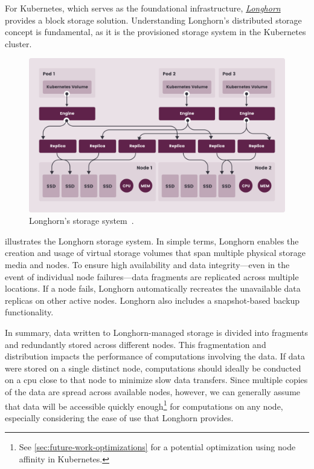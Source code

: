 For Kubernetes, which serves as the foundational infrastructure, \href{https://longhorn.io/}{\textit{Longhorn}} provides a block storage solution.
Understanding Longhorn's distributed storage concept is fundamental, as it is the provisioned storage system in the Kubernetes cluster.

\begin{figure}[H]
    \centering
    \includegraphics[width=\textwidth]{figures/longhorn.png}
    \caption{Longhorn's storage system~\cite{LonghornAuthors2024}.}
    \label{fig:longhorn}
\end{figure}

 illustrates the Longhorn storage system.
In simple terms, Longhorn enables the creation and usage of virtual storage volumes that span multiple physical storage media and nodes.
To ensure high availability and data integrity—even in the event of individual node failures—data fragments are replicated across multiple locations.
If a node fails, Longhorn automatically recreates the unavailable data replicas on other active nodes.
Longhorn also includes a snapshot-based backup functionality.

In summary, data written to Longhorn-managed storage is divided into fragments and redundantly stored across different nodes.
This fragmentation and distribution impacts the performance of computations involving the data.
If data were stored on a single distinct node, computations should ideally be conducted on a \ac{cpu} close to that node to minimize slow data transfers.
Since multiple copies of the data are spread across available nodes, however, we can generally assume that data will be accessible quickly enough\footnote{See \cref{sec:future-work-optimizations} for a potential optimization using node affinity in Kubernetes.} for computations on any node, especially considering the ease of use that Longhorn provides.

